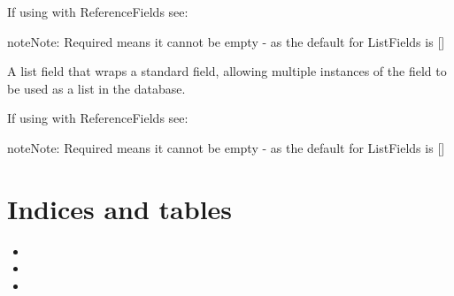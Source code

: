 \documentclass[letterpaper,10pt,english]{sphinxmanual}
\begin{document}
\begin{fulllineitems}
\begin{fulllineitems}
If using with ReferenceFields see: 

\begin{sphinxadmonition}{note}{Note:}
Required means it cannot be empty - as the default for ListFields is {[}{]}
\end{sphinxadmonition}

\end{fulllineitems}


\begin{fulllineitems}
\label{\detokenize{user:user.User.set_descriptives}}
\end{fulllineitems}


\begin{fulllineitems}
\label{\detokenize{user:user.User.tests}}
A list field that wraps a standard field, allowing multiple instances
of the field to be used as a list in the database.

If using with ReferenceFields see: 

\begin{sphinxadmonition}{note}{Note:}
Required means it cannot be empty - as the default for ListFields is {[}{]}
\end{sphinxadmonition}

\end{fulllineitems}


\end{fulllineitems}



\chapter{Indices and tables}
\label{\detokenize{index:indices-and-tables}}\begin{itemize}
\item {} 

\item {} 

\item {} 

\end{itemize}
\end{document}
